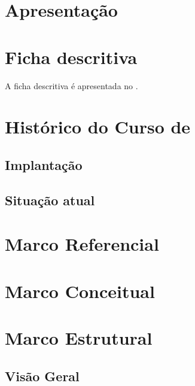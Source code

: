 \documentclass[a4]{ppc-ufscar}
\begin{document}
\chapter{Apresentação}

\ptbrsentenca[201-202]\par
\ptbrparagrafo[1-3]


\chapter{Ficha descritiva}
\ptbrsentenca[18-25]

A ficha descritiva é apresentada no .

\begin{quadro}
    \PPCFichaDescritiva
    \caption{Ficha descritiva do .}
    \label{quadro:ficha-descritiva}
\end{quadro}

\ptbrparagrafo[60]


\chapter{Histórico do Curso de }
\ptbrparagrafo[40]


\section{Implantação}
\ptbrparagrafo[31-35]


\section{Situação atual}
\ptbrparagrafo[38-41]


\chapter{Marco Referencial}
\ptbrparagrafo[10-12]


\chapter{Marco Conceitual}
\ptbrparagrafo[21-24]


\chapter{Marco Estrutural}
\ptbrsentenca[61-62]


\section{Visão Geral}
\ptbrparagrafo[15-16]
\end{document}

